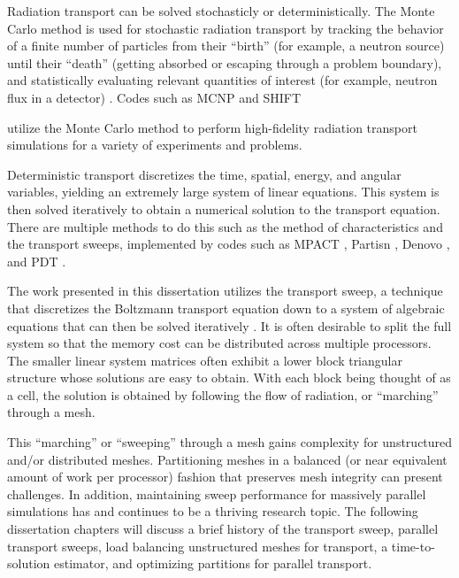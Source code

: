 Radiation transport can be solved stochasticly or deterministically.
The Monte Carlo method is used for stochastic radiation transport by tracking the behavior of a finite number of particles from their ``birth'' (for example, a neutron source) until their ``death'' (getting absorbed or escaping through a problem boundary), and statistically evaluating relevant quantities of interest (for example, neutron flux in a detector) \cite{shultis_mc}.
Codes such as MCNP \cite{MCNP} and SHIFT {\cite{shift} utilize the Monte Carlo method to perform high-fidelity radiation transport simulations for a variety of experiments and problems.

Deterministic transport discretizes the time, spatial, energy, and angular variables, yielding an extremely large system of linear equations. This system is then solved iteratively to obtain a numerical solution to the transport equation.
There are multiple methods to do this such as the method of characteristics and the transport sweeps, implemented by codes such as MPACT \cite{mpact}, Partisn \cite{partisn}, Denovo \cite{denovo}, and PDT \cite{mpadams2013,mpadams2015}.

The work presented in this dissertation utilizes the transport sweep, a technique that discretizes the Boltzmann transport equation \cite{bell_glasstone,zweifel,davison,duderstadt} down to a system of algebraic equations that can then be solved iteratively \cite{adams_larsen}.
It is often desirable to split the full system so that the memory cost can be distributed across multiple processors.
The smaller linear system matrices often exhibit a lower block triangular structure whose solutions are easy to obtain.
With each block being thought of as a cell, the solution is obtained by following the flow of radiation, or ``marching'' through a mesh.

This ``marching'' or ``sweeping'' through a mesh gains complexity for unstructured and/or distributed meshes. Partitioning meshes in a balanced (or near equivalent amount of work per processor) fashion that preserves mesh integrity can present challenges.
In addition, maintaining sweep performance for massively parallel simulations has and continues to be a thriving research topic.
The following dissertation chapters will discuss a brief history of the transport sweep, parallel transport sweeps, load balancing unstructured meshes for transport, a time-to-solution estimator, and optimizing partitions for parallel transport.

}
